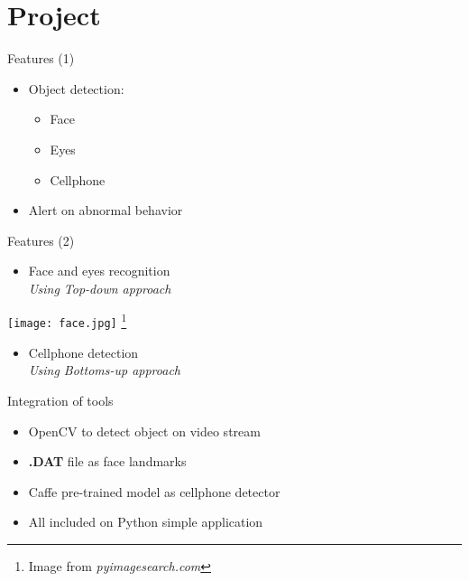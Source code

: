 \documentclass{beamer}
\begin{document}
\section{Project}
\begin{frame}{Features (1)}
    \begin{itemize}
        \item Object detection:
            \begin{itemize}
                \item Face
                \item Eyes
                \item Cellphone
            \end{itemize}
        \item Alert on abnormal behavior
    \end{itemize}
\end{frame}

\begin{frame}{Features (2)}
    \begin{itemize}
        \item Face and eyes recognition \\
            \hspace{0.27cm}\textit{Using Top-down approach}
    \end{itemize}
            \begin{center}
                \texttt{[image: face.jpg]}
                \let\thefootnote\relax\footnote{Image from \textit{pyimagesearch.com}}
            \end{center}
    \begin{itemize}
        \item Cellphone detection \\
            \hspace{0.27cm}\textit{Using Bottoms-up approach}
    \end{itemize}
\end{frame}

\begin{frame}{Integration of tools}
    \begin{itemize}
        \item OpenCV to detect object on video stream
        \item \textbf{.DAT} file as face landmarks
        \item Caffe pre-trained model as cellphone detector
        \item All included on Python simple application
    \end{itemize}
\end{frame}
\end{document}
